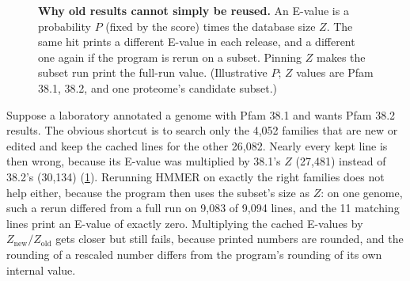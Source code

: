 \documentclass[letterpaper,twocolumn,10pt]{article}
\theoremstyle{definition}
\begin{document}
\begin{figure}[t]
\centering
{}
\caption{\textbf{Why old results cannot simply be reused.} An E-value is a probability $P$ (fixed by the score)
times the database size $Z$. The same hit prints a different E-value in each release, and a different one again
if the program is rerun on a subset. Pinning $Z$ makes the subset run print the full-run value.
(Illustrative $P$; $Z$ values are Pfam 38.1, 38.2, and one proteome's candidate subset.)}
\label{fig:pin}
\end{figure}

Suppose a laboratory annotated a genome with Pfam 38.1 and wants Pfam 38.2 results. The obvious shortcut is to
search only the 4{,}052 families that are new or edited and keep the cached lines for the other 26{,}082. Nearly
every kept line is then wrong, because its E-value was multiplied by 38.1's $Z$ (27{,}481) instead of 38.2's
(30{,}134) (\cref{fig:pin}). Rerunning HMMER on exactly the right families does not help either, because the program
then uses the subset's size as $Z$: on one genome, such a rerun differed from a full run on 9{,}083 of 9{,}094 lines,
and the 11 matching lines print an E-value of exactly zero. Multiplying the cached E-values by
$Z_{\text{new}}/Z_{\text{old}}$ gets closer but still fails, because printed numbers are rounded, and the rounding of
a rescaled number differs from the program's rounding of its own internal value.
\end{document}
